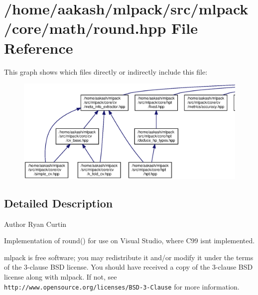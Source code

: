 \section{/home/aakash/mlpack/src/mlpack/core/math/round.hpp File Reference}
\label{round_8hpp}
This graph shows which files directly or indirectly include this file\+:
\nopagebreak
\begin{figure}[H]
\begin{center}
\leavevmode
\includegraphics[width=350pt]{round_8hpp__dep__incl}
\end{center}
\end{figure}


\subsection{Detailed Description}
\begin{DoxyAuthor}{Author}
Ryan Curtin
\end{DoxyAuthor}
Implementation of round() for use on Visual Studio, where C99 isn\textquotesingle{}t implemented.

mlpack is free software; you may redistribute it and/or modify it under the terms of the 3-\/clause B\+SD license. You should have received a copy of the 3-\/clause B\+SD license along with mlpack. If not, see {\tt http\+://www.\+opensource.\+org/licenses/\+B\+S\+D-\/3-\/\+Clause} for more information. 